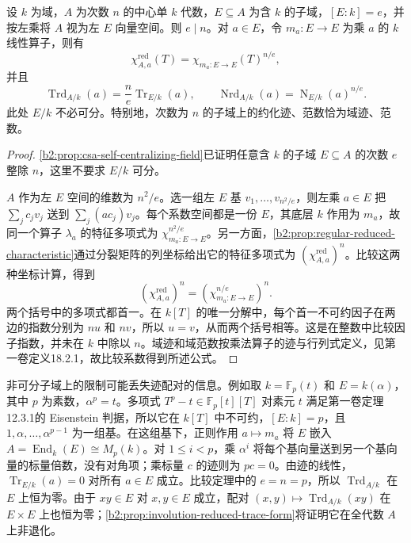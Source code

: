 \begin{theorem}\label{b2:thm:reduced-field-comparison}
	设 \(k\) 为域，\(A\) 为次数 \(n\) 的中心单 \(k\) 代数，\(E\subseteq A\) 为含 \(k\) 的子域，\([E:k]=e\)，并按左乘将 \(A\) 视为左 \(E\) 向量空间。则 \(e\mid n\)。对 \(a\in E\)，令 \(m_a:E\rightarrow E\) 为乘 \(a\) 的 \(k\) 线性算子，则有
	\[
		\chi^{\mathrm{red}}_{A,a}(T)=\chi_{m_a:E\to E}(T)^{n/e},
	\]
	并且
	\[
		\operatorname{Trd}_{A/k}(a)=\frac ne\operatorname{Tr}_{E/k}(a),\qquad \operatorname{Nrd}_{A/k}(a)=\operatorname{N}_{E/k}(a)^{n/e}.
	\]
	此处 \(E/k\) 不必可分。特别地，次数为 \(n\) 的子域上的约化迹、范数恰为域迹、范数。
\end{theorem}
\begin{proof}
	\cref{b2:prop:csa-self-centralizing-field}已证明任意含 \(k\) 的子域 \(E\subseteq A\) 的次数 \(e\) 整除 \(n\)，这里不要求 \(E/k\) 可分。

	\(A\) 作为左 \(E\) 空间的维数为 \(n^2/e\)。选一组左 \(E\) 基 \(v_1,\ldots,v_{n^2/e}\)，则左乘 \(a\in E\) 把 \(\sum_j c_jv_j\) 送到 \(\sum_j (ac_j)v_j\)。每个系数空间都是一份 \(E\)，其底层 \(k\) 作用为 \(m_a\)，故同一个算子 \(\lambda_a\) 的特征多项式为 \(\chi_{m_a:E\to E}^{n^2/e}\)。另一方面，\cref{b2:prop:regular-reduced-characteristic}通过分裂矩阵的列坐标给出它的特征多项式为 \((\chi^{\mathrm{red}}_{A,a})^n\)。比较这两种坐标计算，得到
	\[
		\left(\chi^{\mathrm{red}}_{A,a}\right)^n =\left(\chi_{m_a:E\to E}^{n/e}\right)^n.
	\]
	两个括号中的多项式都首一。在 \(k[T]\) 的唯一分解中，每个首一不可约因子在两边的指数分别为 \(n u\) 和 \(n v\)，所以 \(u=v\)，从而两个括号相等。这是在整数中比较因子指数，并未在 \(k\) 中除以 \(n\)。域迹和域范数按乘法算子的迹与行列式定义，见第一卷定义18.2.1，故比较系数得到所述公式。
\end{proof}

非可分子域上的限制可能丢失迹配对的信息。例如取 \(k=\mathbb F_p(t)\) 和 \(E=k(\alpha)\)，其中 \(p\) 为素数，\(\alpha^p=t\)。多项式 \(T^p-t\in\mathbb F_p[t][T]\) 对素元 \(t\) 满足第一卷定理12.3.1的 Eisenstein 判据，所以它在 \(k[T]\) 中不可约，\([E:k]=p\)，且 \(1,\alpha,\ldots,\alpha^{p-1}\) 为一组基。在这组基下，正则作用 \(a\mapsto m_a\) 将 \(E\) 嵌入 \(A=\operatorname{End}_k(E)\cong M_p(k)\)。对 \(1\le i<p\)，乘 \(\alpha^i\) 将每个基向量送到另一个基向量的标量倍数，没有对角项；乘标量 \(c\) 的迹则为 \(pc=0\)。由迹的线性，\(\operatorname{Tr}_{E/k}(a)=0\) 对所有 \(a\in E\) 成立。比较定理中的 \(e=n=p\)，所以 \(\operatorname{Trd}_{A/k}\) 在 \(E\) 上恒为零。由于 \(xy\in E\) 对 \(x,y\in E\) 成立，配对 \((x,y)\mapsto\operatorname{Trd}_{A/k}(xy)\) 在 \(E\times E\) 上也恒为零；\cref{b2:prop:involution-reduced-trace-form}将证明它在全代数 \(A\) 上非退化。

